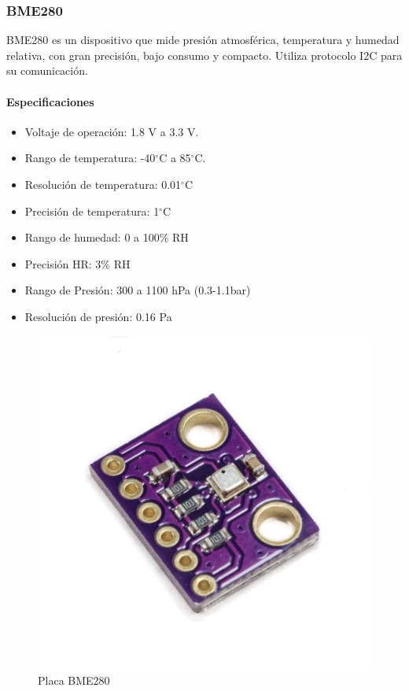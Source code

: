 \documentclass[12pt,a4paper]{article}
\newcommand{\grad}{$^{\circ}$}
\begin{document}
	\subsubsection{BME280}
	BME280 es un dispositivo que mide presión atmosférica, temperatura y humedad relativa, con gran precisión, bajo consumo y compacto. Utiliza protocolo I2C para su comunicación.
		\paragraph*{Especificaciones}
		\begin{itemize}
		\item   Voltaje de operación: 1.8 V a 3.3 V.
		\item	Rango de temperatura: -40\grad C a 85\grad C.
		\item   Resolución de temperatura: 0.01\grad C
		\item	Precisión de temperatura: 1\grad C 
		\item	Rango de humedad: 0 a 100\% RH
		\item   Precisión HR: 3\% RH
		\item Rango de Presión: 300 a 1100 hPa (0.3-1.1bar)
		\item Resolución de presión: 0.16 Pa
	\end{itemize}
	
		\begin{figure}[htb]
		\centering
		\includegraphics[scale=0.35]{bme280.png}
		\caption{Placa BME280}
		\label{fig:BME280}
		\end{figure}
	
\end{document}
